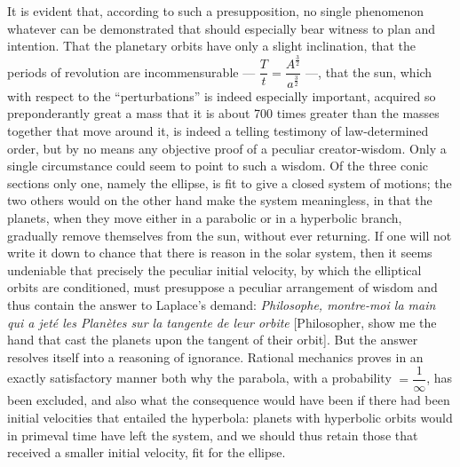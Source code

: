 \documentclass[12pt]{book}
\begin{document}
It is evident that, according to such a presupposition, no single phenomenon whatever can
be demonstrated that should especially bear witness to plan and intention. That the
planetary orbits have only a slight inclination, that the periods of revolution are
incommensurable --- $\dfrac{T}{t} = \dfrac{A^{\frac32}}{a^{\frac32}}$ ---, that the sun,
which with respect to the ``perturbations'' is indeed especially important, acquired so
preponderantly great a mass that it is about 700 times greater than the masses together
that move around it, is indeed a telling testimony of law-determined order, but by no means
any objective proof of a peculiar creator-wisdom. Only a single circumstance could seem to
point to such a wisdom. Of the three conic sections only one, namely the ellipse, is fit to
give a closed system of motions; the two others would on the other hand make the system
meaningless, in that the planets, when they move either in a parabolic or in a hyperbolic
branch, gradually remove themselves from the sun, without ever returning. If one will not
write it down to chance that there is reason in the solar system, then it seems undeniable
that precisely the peculiar initial velocity, by which the elliptical orbits are
conditioned, must presuppose a peculiar arrangement of wisdom and thus contain the answer
to Laplace's demand: \textit{Philosophe, montre-moi la main qui a jeté les Planètes sur la
tangente de leur orbite} [Philosopher, show me the hand that cast the planets upon the
tangent of their orbit]. But the answer resolves itself into a reasoning of ignorance.
Rational mechanics proves in an exactly satisfactory manner both why the parabola, with a
probability $= \dfrac{1}{\infty}$, has been excluded, and also what the consequence would
have been if there had been initial velocities that entailed the hyperbola: planets with
hyperbolic orbits would in primeval time have left the system, and we should thus retain
those that received a smaller initial velocity, fit for the ellipse.
\end{document}
